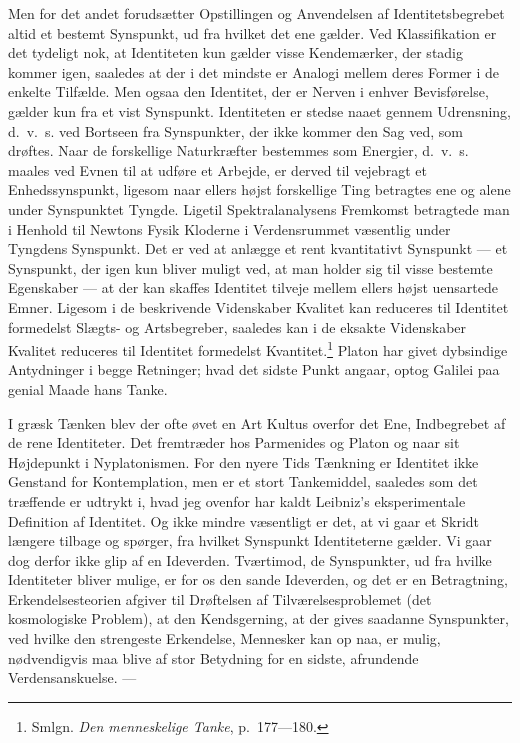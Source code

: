 \documentclass[12pt]{article}
\newcommand{\opage}[1]{\marginnote{\footnotesize\textit{[#1]}}}
\begin{document}
Men for det andet forudsætter Opstillingen og Anvendelsen af
Identitetsbegrebet altid et bestemt Synspunkt, ud fra hvilket det ene
gælder. Ved Klassifikation er det tydeligt nok, at Identiteten kun
gælder visse Kendemærker, der stadig kommer igen, saaledes at der i det
mindste er Analogi mellem deres Former i de enkelte Tilfælde. Men ogsaa
den Identitet, der er Nerven i enhver Bevisførelse, gælder kun fra et
vist Synspunkt. Identiteten er stedse naaet gennem Udrensning, d.~v.~s.
ved Bortseen fra Synspunkter, der ikke kommer den Sag ved, som drøftes.
Naar de forskellige Naturkræfter bestemmes som Energier, d.~v.~s. maales
ved Evnen til at udføre et Arbejde, er derved til%
\opage{42}\setcounter{footnote}{0}%
vejebragt et Enhedssynspunkt, ligesom naar ellers højst forskellige Ting
betragtes ene og alene under Synspunktet Tyngde. Ligetil
Spektralanalysens Fremkomst betragtede man i Henhold til Newtons Fysik
Kloderne i Verdensrummet væsentlig under Tyngdens Synspunkt. Det er ved
at anlægge et rent kvantitativt Synspunkt --- et Synspunkt, der igen kun
bliver muligt ved, at man holder sig til visse bestemte Egenskaber ---
at der kan skaffes Identitet tilveje mellem ellers højst uensartede
Emner. Ligesom i de beskrivende Videnskaber Kvalitet kan reduceres til
Identitet formedelst Slægts- og Artsbegreber, saaledes kan i de eksakte
Videnskaber Kvalitet reduceres til Identitet formedelst
Kvantitet.\footnote{Smlgn. \textit{Den menneskelige Tanke},
p.~177---180.} Platon har givet dybsindige Antydninger i begge
Retninger; hvad det sidste Punkt angaar, optog Galilei paa genial Maade
hans Tanke.

I græsk Tænken blev der ofte øvet en Art Kultus overfor det
\guillemotright Ene\guillemotleft , Indbegrebet af de rene Identiteter.
Det fremtræder hos Parmenides og Platon og naar sit Højdepunkt i
Nyplatonismen. For den nyere Tids Tænkning er Identitet ikke Genstand
for Kontemplation, men er et stort Tankemiddel, saaledes som det
træffende er udtrykt i, hvad jeg ovenfor har kaldt Leibniz's
eksperimentale Definition af Identitet. Og ikke mindre væsentligt er
det, at vi gaar et Skridt længere tilbage og spørger, fra hvilket
Synspunkt Identiteterne gælder. Vi gaar dog derfor ikke glip af en
Ideverden. Tværtimod, de Synspunkter, ud fra hvilke Identiteter bliver
mulige, er for os den sande Ideverden, og det er en Betragtning,
Erkendelsesteorien afgiver til Drøftelsen af Tilværelsesproblemet (det
kosmologiske Problem), at den Kendsgerning, at der gives saadanne
Synspunkter, ved hvilke den strengeste Erkendelse, Mennesker kan op%
\opage{43}\setcounter{footnote}{0}%
naa, er mulig, nødvendigvis maa blive af stor Betydning for en sidste,
afrundende Verdensanskuelse. ---
\end{document}
